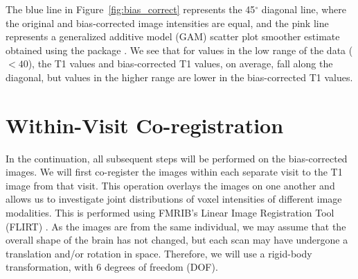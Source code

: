 The blue line in Figure~\ref{fig:bias_correct}\protect{} represents the 45$^{\circ}$ diagonal line, where the original and bias-corrected image intensities are equal, and the pink line represents a generalized additive model (GAM) \citep{hastie_generalized_1990} scatter plot smoother estimate obtained using the  package \citep{wood_fast_2011}.  We see that for values in the low range of the data ($< 40$), the T1 values and bias-corrected T1 values, on average, fall along the diagonal, but values in the higher range are lower in the bias-corrected T1 values.






\section{Within-Visit Co-registration}
In the continuation, all subsequent steps will be performed on the bias-corrected images.  We will first co-register the images within each separate visit to the T1 image from that visit.  This operation overlays the images on one another and allows us to investigate joint distributions of voxel intensities of different image modalities.  This is performed using FMRIB's Linear Image Registration Tool (FLIRT) \citep{jenkinson_global_2001, jenkinson_improved_2002}.  As the images are from the same individual, we may assume that the overall shape of the brain has not changed, but each scan may have undergone a translation and/or rotation in space.  Therefore, we will use a rigid-body transformation, with $6$ degrees of freedom (DOF).  







